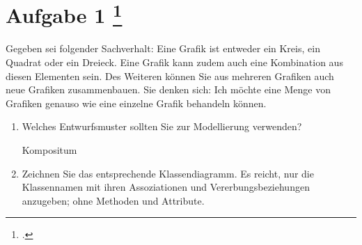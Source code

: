 \documentclass{lehramt-informatik-aufgabe}
\begin{document}
\section{Aufgabe 1
\footcite{examen:66116:2019:03}}

Gegeben sei folgender Sachverhalt: Eine Grafik ist entweder ein Kreis,
ein Quadrat oder ein Dreieck. Eine Grafik kann zudem auch eine
Kombination aus diesen Elementen sein. Des Weiteren können Sie aus
mehreren Grafiken auch neue Grafiken zusammenbauen. Sie denken sich: Ich
möchte eine Menge von Grafiken genauso wie eine einzelne Grafik
behandeln können.
\begin{enumerate}


\item Welches Entwurfsmuster sollten Sie zur Modellierung verwenden?

\begin{liAntwort}
Kompositum
\end{liAntwort}


\item Zeichnen Sie das entsprechende Klassendiagramm. Es reicht, nur die
Klassennamen mit ihren Assoziationen und Vererbungsbeziehungen
anzugeben; \dh ohne Methoden und Attribute.

\begin{liExkurs}[Kompositum]
\liEntwurfsKompositumUml
\end{liExkurs}

\begin{liAntwort}

\end{liAntwort}

\end{enumerate}
\end{document}
